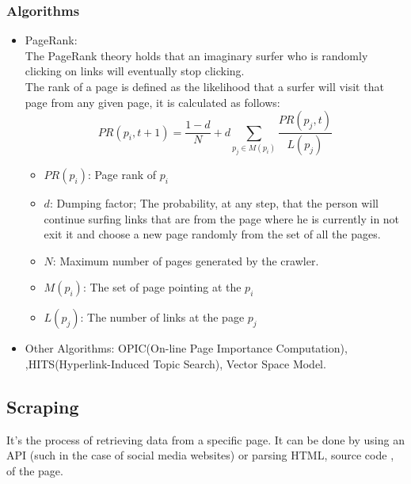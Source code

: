 \documentclass{article}
\begin{document}
\subsubsection{Algorithms}
\begin{itemize}
    \item PageRank:\\
    The PageRank theory holds that an imaginary surfer who is randomly clicking on links will eventually stop clicking.\\
    The rank of a page is defined as the likelihood that a surfer will visit that page from any given page, it is calculated as follows: 
$$PR(p_i,t+1)=\frac{1-d}{N}+d\sum_{p_j\in M(p_i)}\frac{PR(p_j,t)}{L(p_j)}$$
\begin{itemize}
    \item $PR(p_i)$: Page rank of $p_i$
    \item $d$: Dumping factor; The probability, at any step, that the person will continue surfing links that are from the page where he is currently in not exit it and choose a new page randomly from the set of all the pages.
    \item $N$: Maximum number of pages generated by the crawler.
    \item $M(p_i)$: The set of page pointing at the $p_i$
    \item $L(p_j)$: The number of links at the page $p_j$
\end{itemize}
    \item Other Algorithms: OPIC(On-line Page Importance Computation), ,HITS(Hyperlink-Induced Topic Search), Vector Space Model.
\end{itemize}

\subsection{Scraping}
It's the process of retrieving data from a specific page. It can be done by using an API (such in the case of social media websites) or parsing HTML, source code , of the page.
\end{document}
